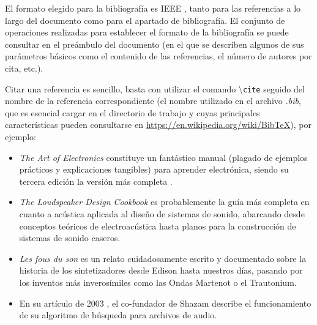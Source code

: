 
El formato elegido para la bibliografía es IEEE , tanto para las referencias a lo largo del documento como para el apartado de bibliografía. El conjunto de operaciones realizadas para establecer el formato de la bibliografía se puede consultar en el preámbulo del documento (en el que se describen algunos de sus parámetros básicos como el contenido de las referencias, el número de autores por cita, etc.).

Citar una referencia es sencillo, basta con utilizar el comando \textbackslash\texttt{cite} seguido del nombre de la referencia correspondiente (el nombre utilizado en el archivo \textit{.bib}, que es esencial cargar en el directorio de trabajo y cuyas principales características pueden consultarse en \url{https://en.wikipedia.org/wiki/BibTeX}), por ejemplo:

\begin{itemize}
    \item \textit{The Art of Electronics} constituye un fantástico manual (plagado de ejemplos prácticos y explicaciones tangibles) para aprender electrónica, siendo su tercera edición la versión más completa \cite{horowitz2015}.
    \item \textit{The Loudspeaker Design Cookbook} \cite{dickson2007} es probablemente la guía más completa en cuanto a acústica aplicada al diseño de sistemas de sonido, abarcando desde conceptos teóricos de electroacústica hasta planos para la construcción de sistemas de sonido caseros.
    \item \textit{Les fous du son} \cite{dewilde2016} es un relato cuidadosamente escrito y documentado sobre la historia de los sintetizadores desde Edison hasta nuestros días, pasando por los inventos más inverosímiles como las Ondas Martenot o el Trautonium.
    \item En su artículo de 2003 \cite{wang2003}, el co-fundador de Shazam describe el funcionamiento de su algoritmo de búsqueda para archivos de audio.
\end{itemize}